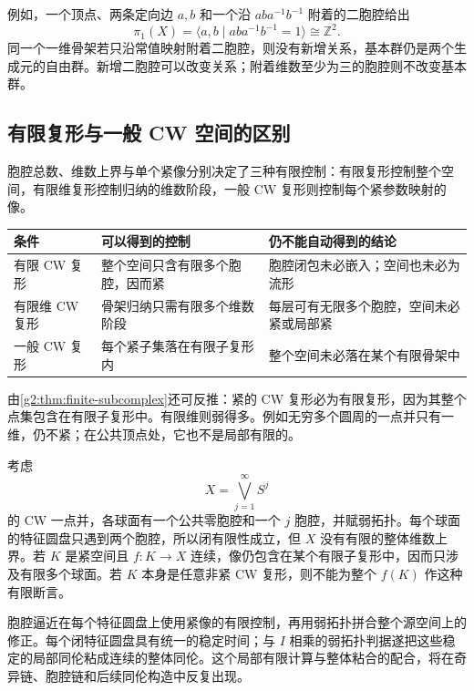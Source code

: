例如，一个顶点、两条定向边 \(a,b\) 和一个沿 \(aba^{-1}b^{-1}\) 附着的二胞腔给出
\[
	\pi_1(X)=\langle a,b\mid aba^{-1}b^{-1}=1\rangle\cong\mathbb Z^2.
\]
同一个一维骨架若只沿常值映射附着二胞腔，则没有新增关系，基本群仍是两个生成元的自由群。新增二胞腔可以改变关系；附着维数至少为三的胞腔则不改变基本群。

\subsection{有限复形与一般 CW 空间的区别}
\label{g2:subsec:0104:04}

胞腔总数、维数上界与单个紧像分别决定了三种有限控制：有限复形控制整个空间，有限维复形控制归纳的维数阶段，一般 CW 复形则控制每个紧参数映射的像。

\begin{center}
	\begin{tabular}{p{}p{}p{}}
		\toprule
		条件 & 可以得到的控制 & 仍不能自动得到的结论\\
		\midrule
		有限 CW 复形 & 整个空间只含有限多个胞腔，因而紧 & 胞腔闭包未必嵌入；空间也未必为流形\\
		有限维 CW 复形 & 骨架归纳只需有限多个维数阶段 & 每层可有无限多个胞腔，空间未必紧或局部紧\\
		一般 CW 复形 & 每个紧子集落在有限子复形内 & 整个空间未必落在某个有限骨架中\\
		\bottomrule
	\end{tabular}
\end{center}

由\cref{g2:thm:finite-subcomplex}还可反推：紧的 CW 复形必为有限复形，因为其整个点集包含在有限子复形中。有限维则弱得多。例如无穷多个圆周的一点并只有一维，仍不紧；在公共顶点处，它也不是局部有限的。

\ProseParagraphBreak

考虑
\[
	X=\bigvee_{j=1}^{\infty}S^j
\]
的 CW 一点并，各球面有一个公共零胞腔和一个 \(j\) 胞腔，并赋弱拓扑。每个球面的特征圆盘只遇到两个胞腔，所以闭有限性成立，但 \(X\) 没有有限的整体维数上界。若 \(K\) 是紧空间且 \(f:K\to X\) 连续，像仍包含在某个有限子复形中，因而只涉及有限多个球面。若 \(K\) 本身是任意非紧 CW 复形，则不能为整个 \(f(K)\) 作这种有限断言。

\ProseParagraphBreak

胞腔逼近在每个特征圆盘上使用紧像的有限控制，再用弱拓扑拼合整个源空间上的修正。每个闭特征圆盘具有统一的稳定时间；与 \(I\) 相乘的弱拓扑判据遂把这些稳定的局部同伦粘成连续的整体同伦。这个局部有限计算与整体粘合的配合，将在奇异链、胞腔链和后续同伦构造中反复出现。
